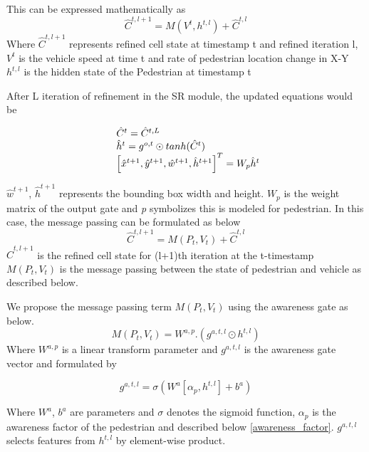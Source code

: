 %
This can be expressed mathematically as
\begin{equation}
\hat{C}^{t, l+1}= M(V^t, {h}^{t, l}) + \hat{C}^{t, l}
\end{equation}
Where $\hat{C}^{t, l+1}$ represents refined cell state at timestamp t and refined iteration l, $V^t$ is the vehicle speed at time t and rate of pedestrian location change in X-Y \\
${h}^{t, l}$ is the hidden state of the Pedestrian at timestamp t

After L iteration of refinement in the SR module, the updated equations would be

\begin{equation}
\begin{array}{l@{}}
\hat{C}^{t}=\hat{C}^{t, L} \\
\hat{h}^{t}={g}^{o,t} \odot tanh(\hat{C}^{t}) \\
\left[ \hat{x}^{t+1}, \hat{y}^{t+1}, \hat{w}^{t+1}, \hat{h}^{t+1} \right] ^ T = W_p\hat{h}^{t}
\end{array}
\end{equation}

$\hat{w}^{t+1}$, $\hat{h}^{t+1}$ represents the bounding box width and height.
$W_p$ is the weight matrix of the output gate and \textit{p} symbolizes this is modeled for pedestrian.
%
In this case, the message passing can be formulated as below 
\begin{equation}
\hat{C}^{t, l+1}=M(P_t, V_t) +  \hat{C}^{t, l}
\end{equation}
$\hat{C}^{t, l+1}$ is the refined cell state for (l+1)th iteration at the t-timestamp \\
$M(P_t, V_t)$ is the message passing between the state of pedestrian and vehicle as described below.

We propose the message passing term $M(P_t, V_t)$ using the awareness gate as below.
\begin{equation}
M(P_t, V_t) = W^{a,p}.(g^{a,t,l} \odot {h}^{t, l} ) 
\end{equation}
Where $W^{a,p}$ is a linear transform parameter and $g^{a,t,l}$ is the awareness gate vector and formulated by

\begin{equation}
g^{a,t,l} = \sigma(W^{a} [ \alpha_p, {h}^{t, l} ] + b^{a} ) 
\end{equation}

Where $W^{a}$, $b^{a}$ are parameters and $\sigma$ denotes the sigmoid function, $\alpha_p$ is the awareness factor of the pedestrian and described below \ref{awareness_factor}.
$g^{a,t,l}$ selects features from ${h}^{t, l}$ by element-wise product.


